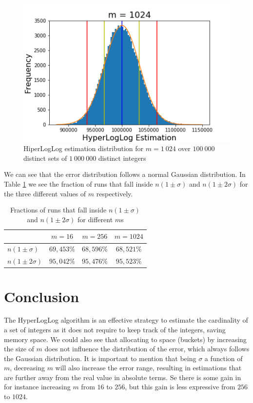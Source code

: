 \documentclass{tufte-handout}
\begin{document}
\begin{figure}[h!]
  \includegraphics[width = \textwidth]{figs/ex41024}
  \caption{HiperLogLog estimation distribution for $m = 1\ 024$ over $100\ 000$ distinct sets of $1\ 000\ 000$ distinct integers}
  \label{fig:1024}
\end{figure}

\noindent We can see that the error distribution follows a normal Gaussian distribution. In Table \ref{fractions} we see the fraction of runs that fall inside $n(1\pm\sigma)$ and $n(1\pm2\sigma)$ for the three different values of $m$ respectively.

\begin{table}
  \centering
  \begin{tabular}{ l | c | c | c}
                     & $m = 16$ & $m = 256$ & $m = 1024$\\ \hline
  $n(1\pm\sigma)$    & $69,453\%$ & $68,596\%$ & $68,521\%$ \\ \hline
  $n(1\pm 2\sigma)$   & $95,042\%$ & $95,476\%$ & $95,523\%$ \\ \hline
  \end{tabular}
  \caption{Fractions of runs that fall inside $n(1\pm\sigma)$ and $n(1\pm2\sigma)$ for different $m$s}
  \label{fractions}
\end{table}

\section{\textbf{Conclusion}}

The HyperLogLog algorithm is an effective strategy to estimate the cardinality of a set of integers as it does not require to keep track of the integers, saving memory space.
\noindent We could also see that  allocating to space (buckets) by increasing the size of $m$ does not influence the distribution of the error, which always follows the Gaussian distribution. It is important to mention that being $\sigma$ a function of $m$, decreasing $m$ will also increase the error range, resulting in estimations that are further away from the real value in absolute terms. Se there is some gain in for instance increasing $m$ from $16$ to $256$, but this gain is less expressive from $256$ to $1024$.
\end{document}
